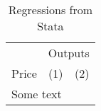 \documentclass[11pt,letterpaper]{article}
\begin{document}
  \begin{table}[H]
    \centering
    \caption{Regressions from Stata}
    \begin{tabular}{lcc} \toprule
      &\multicolumn{2}{c}{Outputs} \\ 
      \cmidrule(r){2-3}
      Price&(1)&(2) \\ \midrule
       
      \bottomrule
      \multicolumn{3}{p{10cm}}{{Some text}}
    \end{tabular}
  \end{table}
\end{document}
